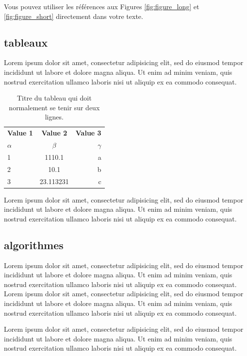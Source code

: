  Vous pouvez utiliser les références aux Figures \ref{fig:figure_long} et \ref{fig:figure_short} directement dans votre texte.

\subsection{tableaux}

Lorem ipsum dolor sit amet, consectetur adipisicing elit, sed do eiusmod
tempor incididunt ut labore et dolore magna aliqua. Ut enim ad minim veniam,
quis nostrud exercitation ullamco laboris nisi ut aliquip ex ea commodo
consequat.

\begin{table}[H]
  \begin{center}
    \caption{Titre du tableau qui doit normalement se tenir sur deux lignes.}
    \label{tab:tableau1}
    \begin{tabular}{l|c|r}
      \textbf{Value 1} & \textbf{Value 2} & \textbf{Value 3}\\
      $\alpha$ & $\beta$ & $\gamma$ \\
      \hline
      1 & 1110.1 & a\\
      2 & 10.1 & b\\
      3 & 23.113231 & c\\
    \end{tabular}
  \end{center}
\end{table}

Lorem ipsum dolor sit amet, consectetur adipisicing elit, sed do eiusmod
tempor incididunt ut labore et dolore magna aliqua. Ut enim ad minim veniam,
quis nostrud exercitation ullamco laboris nisi ut aliquip ex ea commodo
consequat.

\subsection{algorithmes}

Lorem ipsum dolor sit amet, consectetur adipisicing elit, sed do eiusmod
tempor incididunt ut labore et dolore magna aliqua. Ut enim ad minim veniam,
quis nostrud exercitation ullamco laboris nisi ut aliquip ex ea commodo
consequat. Lorem ipsum dolor sit amet, consectetur adipisicing elit, sed do eiusmod
tempor incididunt ut labore et dolore magna aliqua. Ut enim ad minim veniam,
quis nostrud exercitation ullamco laboris nisi ut aliquip ex ea commodo
consequat.

Lorem ipsum dolor sit amet, consectetur adipisicing elit, sed do eiusmod
tempor incididunt ut labore et dolore magna aliqua. Ut enim ad minim veniam,
quis nostrud exercitation ullamco laboris nisi ut aliquip ex ea commodo
consequat.

